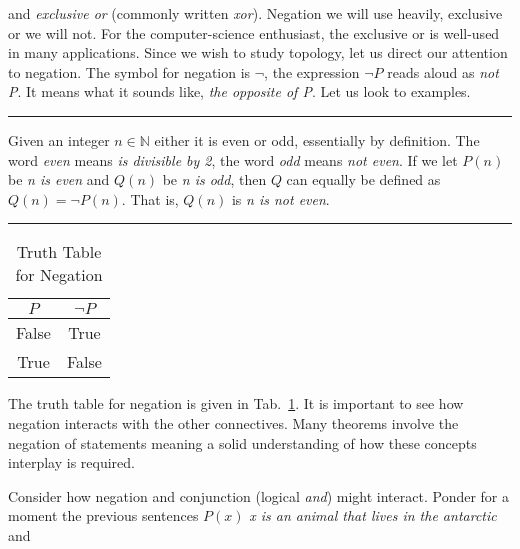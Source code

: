             and \textit{exclusive or} (commonly written \textit{xor}). Negation
            we will use heavily, exclusive or we will not. For the
            computer-science enthusiast, the exclusive or is well-used in many
            applications. Since we wish to study topology, let us direct our
            attention to negation. The symbol for negation is $\neg$, the
            expression $\neg{P}$ reads aloud as \textit{not P}. It means what it
            sounds like, \textit{the opposite of P}. Let us look to examples.
            \par\hfill\par\hrule
            \begin{example}
                Given an integer $n\in\mathbb{N}$ either it is even or odd,
                essentially by definition. The word \textit{even} means
                \textit{is divisible by 2}, the word \textit{odd} means
                \textit{not even}. If we let $P(n)$ be \textit{n is even} and
                $Q(n)$ be \textit{n is odd}, then $Q$ can equally be defined as
                $Q(n)=\neg{P}(n)$. That is, $Q(n)$ is \textit{n is not even}.
            \end{example}
            \hrule\par\hfill\par
            \begin{table}
                \centering
                \begin{tabular}{c | c }
                    $P$&$\neg{P}$\\
                    \hline
                    False&True\\
                    \hline
                    True&False
                \end{tabular}
                \caption{Truth Table for Negation}
                \label{tab:truth_table_negation}
            \end{table}
            The truth table for negation is given in
            Tab.~\ref{tab:truth_table_negation}. It is important to see how
            negation interacts with the other connectives. Many theorems
            involve the negation of statements meaning a solid understanding of
            how these concepts interplay is required.
            \par\hfill\par
            Consider how negation and conjunction (logical \textit{and}) might
            interact. Ponder for a moment the previous sentences
            $P(x)$ \textit{x is an animal that lives in the antarctic} and
